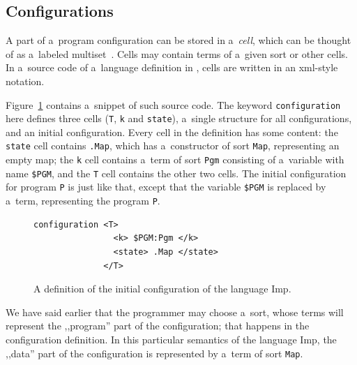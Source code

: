 \documentclass{fithesis3}
\begin{document}
\subsection{Configurations}

A part of a~program configuration can be stored in a~\textit{cell}, which can be thought of as a~labeled multiset~\cite{hathhorn-ellison-rosu-2015-pldi}. Cells may contain terms of a~given sort or other cells. In a~source code of a~language definition in \K, cells are written in an xml-style notation.

Figure~\ref{impConfiguration} contains a~snippet of such source code. The keyword \texttt{configuration} here defines three cells (\texttt{T}, \texttt{k} and \texttt{state}), a~single structure for all configurations, and an initial configuration. Every cell in the definition has some content: the \texttt{state} cell contains \lstinline{.Map}, which has a~constructor of sort \texttt{Map}, representing an empty map; the \texttt{k} cell contains a~term of sort \texttt{Pgm} consisting of a~variable with name \texttt{\$PGM}, and the \texttt{T} cell contains the other two cells. The initial configuration for program \texttt{P} is just like that, except that the variable \texttt{\$PGM} is replaced by a~term, representing the program \texttt{P}.

\begin{figure}
\begin{lstlisting}
configuration <T>
                <k> $PGM:Pgm </k>
                <state> .Map </state>
              </T>
\end{lstlisting}
\caption{A definition of the initial configuration of the language Imp.}
\label{impConfiguration}
\end{figure}

We have said earlier that the programmer may choose a~sort, whose terms will represent the ,,program'' part of the configuration; that happens in the configuration definition. In this particular semantics of the language Imp, the ,,data'' part of the configuration is represented by a~term of sort \texttt{Map}. %





\end{document}

